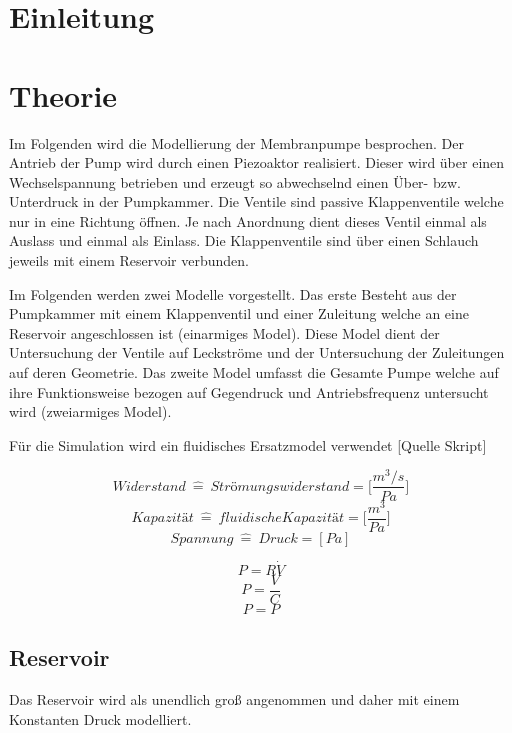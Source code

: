\documentclass[fontsize=12pt, a4paper]{scrartcl}
\let\stdsection\section 	%
\renewcommand\section{\newpage\stdsection}
\begin{document}
\tableofcontents            %


\section{Einleitung}



\section{Theorie}

Im Folgenden wird die Modellierung der Membranpumpe besprochen. Der Antrieb der Pump wird durch einen Piezoaktor realisiert. Dieser wird über einen Wechselspannung betrieben und erzeugt so abwechselnd einen Über- bzw. Unterdruck in der Pumpkammer. Die Ventile sind passive Klappenventile welche nur in eine Richtung öffnen. Je nach Anordnung dient dieses Ventil einmal als Auslass und einmal als Einlass. Die Klappenventile sind über einen Schlauch jeweils mit einem Reservoir verbunden.

Im Folgenden werden zwei Modelle vorgestellt. Das erste Besteht aus der Pumpkammer mit einem Klappenventil und einer Zuleitung welche an eine Reservoir angeschlossen ist (einarmiges Model). Diese Model dient der Untersuchung der Ventile auf Leckströme und der Untersuchung der Zuleitungen auf deren Geometrie. Das zweite Model umfasst die Gesamte Pumpe welche auf ihre Funktionsweise bezogen auf Gegendruck und Antriebsfrequenz untersucht wird (zweiarmiges Model).

Für die Simulation wird ein fluidisches Ersatzmodel verwendet [Quelle Skript]

\[ Widerstand \:\widehat{=}\:  Strömungswiderstand = \biggl[\frac{m^3/s}{Pa}\biggr] \]
\[ Kapazität  \:\widehat{=}\:  fluidische Kapazität = \biggl[\frac{m^3}{Pa}\biggr] \]
\[ Spannung  \:\widehat{=}\:  Druck = [Pa] \]

\[ P = R\dot{V} \]
\[ P = \frac{V}{C} \]
\[ P = P \]

\subsection{Reservoir}
Das Reservoir wird als unendlich groß angenommen und daher mit einem Konstanten Druck modelliert.
\end{document}
